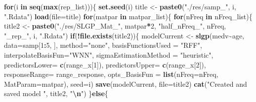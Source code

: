 \documentclass[
]{article}
\newenvironment{Shaded}{\begin{snugshade}}{\end{snugshade}}
\newcommand{\AttributeTok}[1]{\textcolor[rgb]{0.13,0.29,0.53}{#1}}
\newcommand{\ControlFlowTok}[1]{\textcolor[rgb]{0.13,0.29,0.53}{\textbf{#1}}}
\newcommand{\DecValTok}[1]{\textcolor[rgb]{0.00,0.00,0.81}{#1}}
\newcommand{\FunctionTok}[1]{\textcolor[rgb]{0.13,0.29,0.53}{\textbf{#1}}}
\newcommand{\NormalTok}[1]{#1}
\newcommand{\OtherTok}[1]{\textcolor[rgb]{0.56,0.35,0.01}{#1}}
\newcommand{\SpecialCharTok}[1]{\textcolor[rgb]{0.81,0.36,0.00}{\textbf{#1}}}
\newcommand{\StringTok}[1]{\textcolor[rgb]{0.31,0.60,0.02}{#1}}
\begin{document}
\begin{Shaded}
\begin{Highlighting}[]
\ControlFlowTok{for}\NormalTok{(i }\ControlFlowTok{in} \FunctionTok{seq}\NormalTok{(}\FunctionTok{max}\NormalTok{(rep\_list)))\{}
  \FunctionTok{set.seed}\NormalTok{(i)}
\NormalTok{  title }\OtherTok{\textless{}{-}} \FunctionTok{paste0}\NormalTok{(}\StringTok{"./res/samp\_"}\NormalTok{, i, }\StringTok{".Rdata"}\NormalTok{)}
  \FunctionTok{load}\NormalTok{(}\AttributeTok{file=}\NormalTok{title)}
  \ControlFlowTok{for}\NormalTok{(matpar }\ControlFlowTok{in}\NormalTok{ matpar\_list)\{}
    \ControlFlowTok{for}\NormalTok{(nFreq }\ControlFlowTok{in}\NormalTok{ nFreq\_list)\{}
\NormalTok{      title2 }\OtherTok{\textless{}{-}} \FunctionTok{paste0}\NormalTok{(}\StringTok{"./res/SLGP\_Mat\_"}\NormalTok{, matpar}\SpecialCharTok{*}\DecValTok{2}\NormalTok{, }
                       \StringTok{"half\_nFreq\_"}\NormalTok{, nFreq,}
                       \StringTok{"\_rep\_"}\NormalTok{, i, }\StringTok{".Rdata"}\NormalTok{)}
      \ControlFlowTok{if}\NormalTok{(}\SpecialCharTok{!}\FunctionTok{file.exists}\NormalTok{(title2))\{}
\NormalTok{        modelCurrent }\OtherTok{\textless{}{-}} \FunctionTok{slgp}\NormalTok{(medv}\SpecialCharTok{\textasciitilde{}}\NormalTok{age, }
                             \AttributeTok{data=}\NormalTok{samp[}\DecValTok{1}\SpecialCharTok{:}\DecValTok{5}\NormalTok{, ],}
                             \AttributeTok{method=}\StringTok{"none"}\NormalTok{, }
                             \AttributeTok{basisFunctionsUsed =} \StringTok{"RFF"}\NormalTok{,}
                             \AttributeTok{interpolateBasisFun=}\StringTok{"WNN"}\NormalTok{, }
                             \AttributeTok{sigmaEstimationMethod =} \StringTok{"heuristic"}\NormalTok{, }
                             \AttributeTok{predictorsLower=} \FunctionTok{c}\NormalTok{(range\_x[}\DecValTok{1}\NormalTok{]),}
                             \AttributeTok{predictorsUpper=} \FunctionTok{c}\NormalTok{(range\_x[}\DecValTok{2}\NormalTok{]),}
                             \AttributeTok{responseRange=}\NormalTok{ range\_response,}
                             \AttributeTok{opts\_BasisFun =} \FunctionTok{list}\NormalTok{(}\AttributeTok{nFreq=}\NormalTok{nFreq,}
                                                  \AttributeTok{MatParam=}\NormalTok{matpar),}
                             \AttributeTok{seed=}\NormalTok{i)}
        \FunctionTok{save}\NormalTok{(modelCurrent, }\AttributeTok{file=}\NormalTok{title2)}
        \FunctionTok{cat}\NormalTok{(}\StringTok{"Created and saved model "}\NormalTok{, title2, }\StringTok{"}\SpecialCharTok{\textbackslash{}n}\StringTok{"}\NormalTok{)}
\NormalTok{      \}}\ControlFlowTok{else}\NormalTok{\{}

\end{Highlighting}
\end{Shaded}
\end{document}
